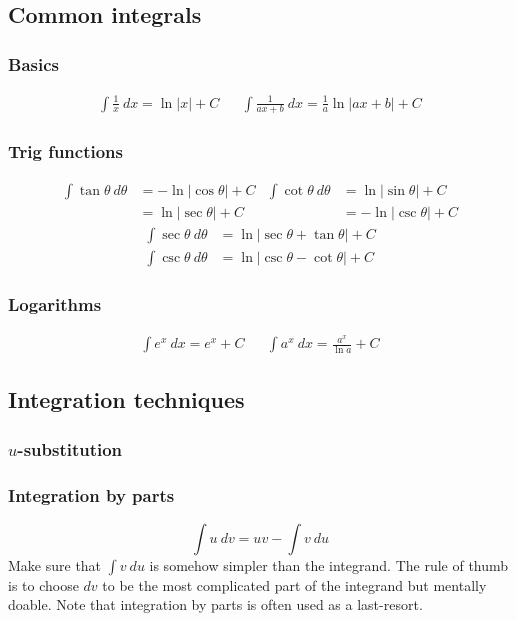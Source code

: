 \documentclass[main.tex]{subfiles}
\begin{document}
\begin{multicols}{2}
	\subsection*{Common integrals}
	\subsubsection*{Basics}
	\begin{align*}
	\int \frac{1}{x} \ dx = \ln |x| + C && \int \frac{1}{ax + b} \ dx = \frac{1}{a} \ln |ax + b| + C
	\end{align*}

	\subsubsection*{Trig functions}
	\begin{align*}
		\int \tan{\theta} \ d\theta &= -\ln{|\cos{\theta}|} + C & \int \cot{\theta} \ d\theta &= \ln{|\sin{\theta}|} + C \\
		&= \ln{|\sec{\theta}|} + C & &= -\ln{|\csc{\theta}|} + C
	\end{align*}
	\begin{align*}
		\int \sec{\theta} \ d\theta &= \ln{|\sec{\theta} + \tan{\theta}|} + C \\
		\int \csc{\theta} \ d\theta &= \ln{|\csc{\theta} - \cot{\theta}|} + C
	\end{align*}
	\subsubsection*{Logarithms}
	\begin{align*}
	\int e^x \ dx = e^x + C && \int a^x \ dx = \frac{a^x}{\ln{a}} + C
	\end{align*}

	\subsection*{Integration techniques}
	\subsubsection*{\(u\)-substitution}

	\subsubsection*{Integration by parts}
	\[\int u \ dv = uv - \int v \ du\]
	Make sure that \(\int v \ du\) is somehow simpler than the integrand. The rule of thumb is to choose \(dv\) to be the most complicated part of the integrand but mentally doable. Note that integration by parts is often used as a last-resort.


\end{multicols}
\end{document}

